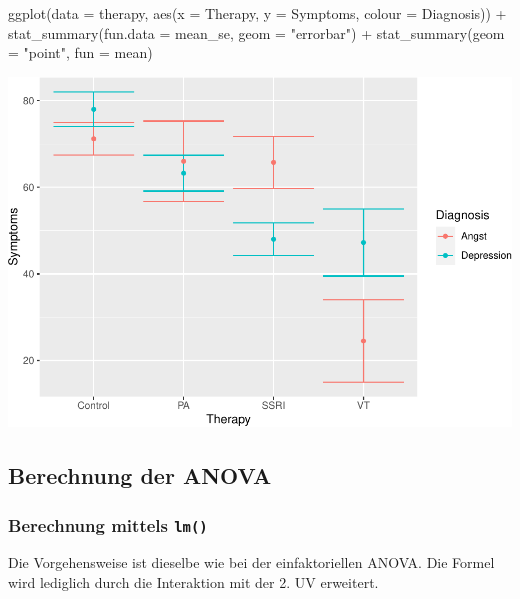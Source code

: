 \documentclass[
]{book}
\newenvironment{Shaded}{\begin{snugshade}}{\end{snugshade}}
\newcommand{\AttributeTok}[1]{\textcolor[rgb]{0.77,0.63,0.00}{#1}}
\newcommand{\FunctionTok}[1]{\textcolor[rgb]{0.00,0.00,0.00}{#1}}
\newcommand{\NormalTok}[1]{#1}
\newcommand{\SpecialCharTok}[1]{\textcolor[rgb]{0.00,0.00,0.00}{#1}}
\newcommand{\StringTok}[1]{\textcolor[rgb]{0.31,0.60,0.02}{#1}}
\begin{document}
\begin{Shaded}
\begin{Highlighting}[]
\FunctionTok{ggplot}\NormalTok{(}\AttributeTok{data =}\NormalTok{ therapy, }\FunctionTok{aes}\NormalTok{(}\AttributeTok{x =}\NormalTok{ Therapy, }\AttributeTok{y =}\NormalTok{ Symptoms, }\AttributeTok{colour =}\NormalTok{ Diagnosis)) }\SpecialCharTok{+}
  \FunctionTok{stat\_summary}\NormalTok{(}\AttributeTok{fun.data =}\NormalTok{ mean\_se,  }\AttributeTok{geom =} \StringTok{"errorbar"}\NormalTok{) }\SpecialCharTok{+}
  \FunctionTok{stat\_summary}\NormalTok{(}\AttributeTok{geom =} \StringTok{"point"}\NormalTok{, }\AttributeTok{fun =}\NormalTok{ mean) }
\end{Highlighting}
\end{Shaded}

\includegraphics{CFH_R_bookdown_files/figure-latex/unnamed-chunk-313-1.pdf}

\hypertarget{berechnung-der-anova-1}{%
\subsection{Berechnung der ANOVA}\label{berechnung-der-anova-1}}

\hypertarget{berechnung-mittels-lm-1}{%
\subsubsection{\texorpdfstring{Berechnung mittels \texttt{lm()}}{Berechnung mittels lm()}}\label{berechnung-mittels-lm-1}}

Die Vorgehensweise ist dieselbe wie bei der einfaktoriellen ANOVA. Die Formel wird lediglich durch die Interaktion mit der 2. UV erweitert.
\end{document}
